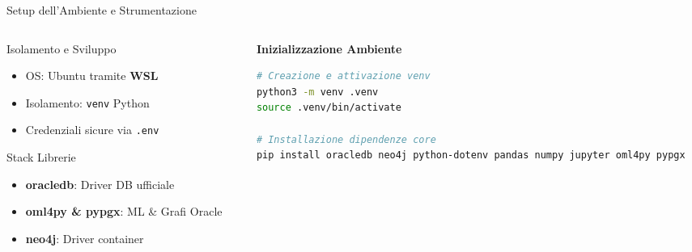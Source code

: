 \documentclass[aspectratio=169]{beamer}
\begin{document}
\begin{frame}[fragile]{Setup dell'Ambiente e Strumentazione}
    \begin{columns}[T]
        \begin{column}{0.48\textwidth}
            \begin{block}{\faLinux \hspace{0.2cm} Isolamento e Sviluppo}
                \small
                \begin{itemize}
                    \item OS: Ubuntu tramite \textbf{WSL}
                    \item Isolamento: \texttt{venv} Python
                    \item Credenziali sicure via \texttt{.env}
                \end{itemize}
            \end{block}
            
            \vspace{0.2cm}
            
            \begin{exampleblock}{\faCogs \hspace{0.2cm} Stack Librerie}
                \small
                \begin{itemize}
                    \item \textbf{oracledb}: Driver DB ufficiale
                    \item \textbf{oml4py \& pypgx}: ML \& Grafi Oracle
                    \item \textbf{neo4j}: Driver container
                \end{itemize}
            \end{exampleblock}
        \end{column}
        
        \begin{column}{0.48\textwidth}
            \textbf{\faTerminal \hspace{0.2cm} Inizializzazione Ambiente}
            \begin{lstlisting}[language=bash, basicstyle=\ttfamily\tiny]
# Creazione e attivazione venv
python3 -m venv .venv
source .venv/bin/activate

# Installazione dipendenze core
pip install oracledb neo4j python-dotenv pandas numpy jupyter oml4py pypgx
            \end{lstlisting}
        \end{column}
    \end{columns}
\end{frame}
\end{document}

